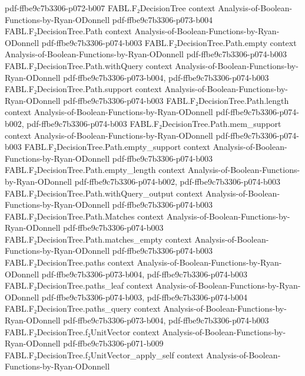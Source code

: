 \begin{theorem}
  {pdf-ffbe9c7b3306-p072-b007}
\proofstep
  {FABL.F₂DecisionTree}
  {context}
  {Analysis-of-Boolean-Functions-by-Ryan-ODonnell}
  {pdf-ffbe9c7b3306-p073-b004}
\proofstep
  {FABL.F₂DecisionTree.Path}
  {context}
  {Analysis-of-Boolean-Functions-by-Ryan-ODonnell}
  {pdf-ffbe9c7b3306-p074-b003}
\proofstep
  {FABL.F₂DecisionTree.Path.empty}
  {context}
  {Analysis-of-Boolean-Functions-by-Ryan-ODonnell}
  {pdf-ffbe9c7b3306-p074-b003}
\proofstep
  {FABL.F₂DecisionTree.Path.withQuery}
  {context}
  {Analysis-of-Boolean-Functions-by-Ryan-ODonnell}
  {pdf-ffbe9c7b3306-p073-b004,
    pdf-ffbe9c7b3306-p074-b003}
\proofstep
  {FABL.F₂DecisionTree.Path.support}
  {context}
  {Analysis-of-Boolean-Functions-by-Ryan-ODonnell}
  {pdf-ffbe9c7b3306-p074-b003}
\proofstep
  {FABL.F₂DecisionTree.Path.length}
  {context}
  {Analysis-of-Boolean-Functions-by-Ryan-ODonnell}
  {pdf-ffbe9c7b3306-p074-b002,
    pdf-ffbe9c7b3306-p074-b003}
\proofstep
  {FABL.F₂DecisionTree.Path.mem_support}
  {context}
  {Analysis-of-Boolean-Functions-by-Ryan-ODonnell}
  {pdf-ffbe9c7b3306-p074-b003}
\proofstep
  {FABL.F₂DecisionTree.Path.empty_support}
  {context}
  {Analysis-of-Boolean-Functions-by-Ryan-ODonnell}
  {pdf-ffbe9c7b3306-p074-b003}
\proofstep
  {FABL.F₂DecisionTree.Path.empty_length}
  {context}
  {Analysis-of-Boolean-Functions-by-Ryan-ODonnell}
  {pdf-ffbe9c7b3306-p074-b002,
    pdf-ffbe9c7b3306-p074-b003}
\proofstep
  {FABL.F₂DecisionTree.Path.withQuery_output}
  {context}
  {Analysis-of-Boolean-Functions-by-Ryan-ODonnell}
  {pdf-ffbe9c7b3306-p074-b003}
\proofstep
  {FABL.F₂DecisionTree.Path.Matches}
  {context}
  {Analysis-of-Boolean-Functions-by-Ryan-ODonnell}
  {pdf-ffbe9c7b3306-p074-b003}
\proofstep
  {FABL.F₂DecisionTree.Path.matches_empty}
  {context}
  {Analysis-of-Boolean-Functions-by-Ryan-ODonnell}
  {pdf-ffbe9c7b3306-p074-b003}
\proofstep
  {FABL.F₂DecisionTree.paths}
  {context}
  {Analysis-of-Boolean-Functions-by-Ryan-ODonnell}
  {pdf-ffbe9c7b3306-p073-b004,
    pdf-ffbe9c7b3306-p074-b003}
\proofstep
  {FABL.F₂DecisionTree.paths_leaf}
  {context}
  {Analysis-of-Boolean-Functions-by-Ryan-ODonnell}
  {pdf-ffbe9c7b3306-p074-b003,
    pdf-ffbe9c7b3306-p074-b004}
\proofstep
  {FABL.F₂DecisionTree.paths_query}
  {context}
  {Analysis-of-Boolean-Functions-by-Ryan-ODonnell}
  {pdf-ffbe9c7b3306-p073-b004,
    pdf-ffbe9c7b3306-p074-b003}
\proofstep
  {FABL.F₂DecisionTree.f₂UnitVector}
  {context}
  {Analysis-of-Boolean-Functions-by-Ryan-ODonnell}
  {pdf-ffbe9c7b3306-p071-b009}
\proofstep
  {FABL.F₂DecisionTree.f₂UnitVector_apply_self}
  {context}
  {Analysis-of-Boolean-Functions-by-Ryan-ODonnell}

\end{theorem}
